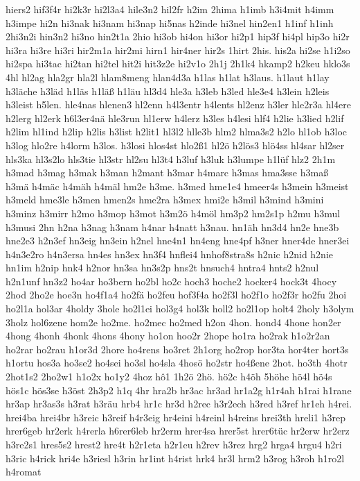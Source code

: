 {hiers2
hif3f4r
hi2k3r
hi2l3a4
hile3n2
hil2fr
h2im
2hima
h1imb
h3i4mit
h4imm
h3impe
hi2n
hi3nak
hi3nam
hi3nap
hi5nas
h2inde
hi3nel
hin2en1
h1inf
h1inh
2hi3n2i
hin3n2
hi3no
hin2t1a
2hio
hi3ob
hi4on
hi3or
hi2p1
hip3f
hi4pl
hip3o
hi2r
hi3ra
hi3re
hi3ri
hir2m1a
hir2mi
hirn1
hir4ner
hir2s
1hirt
2his.
his2a
hi2se
h1i2so
hi2spa
hi3tac
hi2tan
hi2tel
hit2i
hit3z2e
hi2v1o
2h1j
2h1k4
hkamp2
h2keu
hklo3s
4hl
hl2ag
hla2gr
hla2l
hlam8meng
hlan4d3a
h1las
h1lat
h3laus.
h1laut
h1lay
h3läche
h3läd
h1läs
h1läß
h1läu
hl3d4
hle3a
h3leb
h3led
hle3e4
h3lein
h2leis
h3leist
h5len.
hle4nas
hlenen3
hl2enn
h4l3entr
h4lents
hl2enz
h3ler
hle2r3a
hl4ere
h2lerg
hl2erk
h6l3er4nä
hle3run
hl1erw
h4lerz
h3les
h4lesi
hlf4
h2lie
h3lied
h2lif
h2lim
hl1ind
h2lip
h2lis
h3list
h2lit1
hl3l2
hlle3b
hlm2
hlma3s2
h2lo
hl1ob
h3loc
h3log
hlo2re
h4lorm
h3los.
h3losi
hlos4st
hlo2ß1
hl2ö
h2lös3
hlö4ss
hl4sar
hl2ser
hls3ka
hl3s2lo
hls3tie
hl3str
hl2su
hl3t4
h3luf
h3luk
h3lumpe
h1lüf
hlz2
2h1m
h3mad
h3mag
h3mak
h3man
h2mant
h3mar
h4marc
h3mas
hma3sse
h3maß
h3mä
h4mäc
h4mäh
h4mäl
hm2e
h3me.
h3med
hme1e4
hmeer4s
h3mein
h3meist
h3meld
hme3le
h3men
hmen2s
hme2ra
h3mex
hmi2e
h3mil
h3mind
h3mini
h3minz
h3mirr
h2mo
h3mop
h3mot
h3m2ö
h4möl
hm3p2
hm2s1p
h2mu
h3mul
h3musi
2hn
h2na
h3nag
h3nam
h4nar
h4natt
h3nau.
hn1äh
hn3d4
hn2e
hne3b
hne2e3
h2n3ef
hn3eig
hn3ein
h2nel
hne4n1
hn4eng
hne4pf
h3ner
hner4de
hner3ei
h4n3e2ro
h4n3ersa
hn4es
hn3ex
hn3f4
hnflei4
hnhof8stra8s
h2nic
h2nid
h2nie
hn1im
h2nip
hnk4
h2nor
hn3sa
hn3s2p
hns2t
hnsuch4
hntra4
hnts2
h2nul
h2n1unf
hn3z2
ho4ar
ho3bern
ho2bl
ho2c
hoch3
hoche2
hocker4
hock3t
4hocy
2hod
2ho2e
hoe3n
ho4f1a4
ho2fä
ho2feu
hof3f4a
ho2f3l
ho2f1o
ho2f3r
ho2fu
2hoi
ho2l1a
hol3ar
4holdy
3hole
ho2l1ei
hol3g4
hol3k
holl2
ho2l1op
holt4
2holy
h3olym
3holz
hol6zene
hom2e
ho2me.
ho2mec
ho2med
h2on
4hon.
hond4
4hone
hon2er
4hong
4honh
4honk
4hons
4hony
ho1on
hoo2r
2hope
ho1ra
ho2rak
h1o2r2an
ho2rar
ho2rau
h1or3d
2hore
ho4rens
ho3ret
2h1org
ho2rop
hor3ta
hor4ter
hort3s
h1ortu
hos3a
ho3se2
ho4sei
ho3sl
ho4sla
4hosö
ho2str
ho4ßene
2hot.
ho3th
4hotr
2hot1s2
2ho2w1
h1o2x
ho1y2
4hoz
hô1
1h2ö
2hö.
hö2c
h4öh
5höhe
hö4l
hö4s
hös1c
hös3se
h3öst
2h3p2
h1q
4hr
hra2b
hr3ac
hr3ad
hr1a2g
h1r4ah
h1rai
h1rane
hr3ap
hr3as3s
h3rat
h3räu
hrb4
hr1c
hr3d
h2rec
h3r2ech
h3red
h3ref
hr1eh
h4rei.
hrei4ba
hrei4br
h3reic
h3reif
h4r3eig
hr4eini
h4reinl
h4reins
hrei3th
hreli1
h3rep
hrer6geb
hr2erk
h4rerla
h6rer6leb
hr2erm
hrer4sa
hrer5st
hrer6tüc
hr2erw
hr2erz
h3re2s1
hres5s2
hrest2
hre4t
h2r1eta
h2r1eu
h2rev
h3rez
hrg2
hrga4
hrgu4
h2ri
h3ric
h4rick
hri4e
h3riesl
h3rin
hr1int
h4rist
hrk4
hr3l
hrm2
h3rog
h3roh
h1ro2l
h4romat
}
